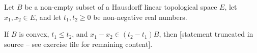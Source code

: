 Let $B$ be a non-empty subset of a Hausdorff linear topological space $E$, let $x_1, x_2 \in E$, and let $t_1, t_2 \ge 0$ be non-negative real numbers.

 If $B$ is convex, $t_1 \le t_2$, and $x_1 - x_2 \in (t_2 - t_1)B$, then [statement truncated in source -- see exercise file for remaining content].
